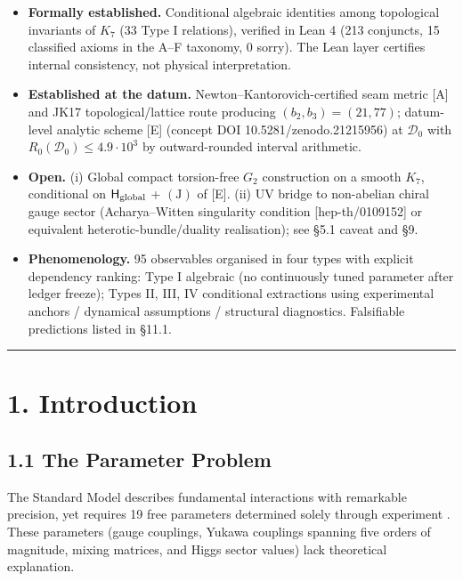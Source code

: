 \documentclass[11pt,a4paper]{article}
\begin{document}
\begin{itemize}
\tightlist
\item
  \textbf{Formally established.} Conditional algebraic identities among topological invariants of \(K_7\) (33 Type I relations), verified in Lean 4 (213 conjuncts, 15 classified axioms in the A--F taxonomy, 0 sorry). The Lean layer certifies internal consistency, not physical interpretation.
\item
  \textbf{Established at the datum.} Newton--Kantorovich-certified seam metric {[}A{]} and JK17 topological/lattice route producing \((b_2, b_3) = (21, 77)\); datum-level analytic scheme {[}E{]} (concept DOI 10.5281/zenodo.21215956) at \(\mathcal D_0\) with \(R_0(\mathcal D_0) \le 4.9 \cdot 10^3\) by outward-rounded interval arithmetic.
\item
  \textbf{Open.} (i) Global compact torsion-free \(G_2\) construction on a smooth \(K_7\), conditional on \(\mathsf H_{\rm global}\) + \((\mathrm J)\) of {[}E{]}. (ii) UV bridge to non-abelian chiral gauge sector (Acharya--Witten singularity condition {[}hep-th/0109152{]} or equivalent heterotic-bundle/duality realisation); see §5.1 caveat and §9.
\item
  \textbf{Phenomenology.} 95 observables organised in four types with explicit dependency ranking: Type I algebraic (no continuously tuned parameter after ledger freeze); Types II, III, IV conditional extractions using experimental anchors / dynamical assumptions / structural diagnostics. Falsifiable predictions listed in §11.1.
\end{itemize}

\begin{center}\rule{\linewidth}{0.5pt}\end{center}

\section{1. Introduction}\label{introduction}

\subsection{1.1 The Parameter Problem}\label{the-parameter-problem}

The Standard Model describes fundamental interactions with remarkable precision, yet requires 19 free parameters determined solely through experiment \cite{1}. These parameters (gauge couplings, Yukawa couplings spanning five orders of magnitude, mixing matrices, and Higgs sector values) lack theoretical explanation.
\end{document}

